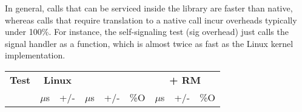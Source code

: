 In general, calls that can be serviced inside the library are faster than native,
whereas calls that require translation to a native call incur overheads typically under 100\%.
For instance, 
the self-signaling test (sig overhead)
just calls the signal handler as a function,
which is almost twice as fast
as the Linux kernel implementation.  

\begin{table}[t!b!]
\footnotesize
\centering
\tabcolsep=0.18cm
\begin{tabular}{|l|rr|rrr|rrr|}
\hline
{\bf Test } & \multicolumn{2}{|c|}{{\bf Linux}} &  \multicolumn{3}{|c|}{{\bf \sysname{}
}} &
\multicolumn{3}{|c|}{{\bf \sysname{} + RM
}} \\

& {\footnotesize $\mu$s} & {\footnotesize +/-} & 
{\footnotesize $\mu$s} & {\footnotesize +/-} & \%O&
{\footnotesize $\mu$s} & {\footnotesize +/-} & \%O\\

\hline


\end{tabular}
\end{table}
